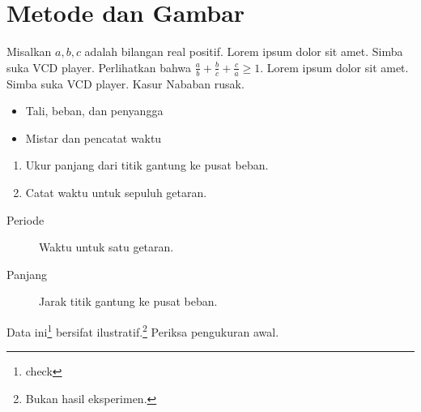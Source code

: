
\section{Metode dan Gambar}
    Misalkan $a,b,c$ adalah bilangan real positif. 
    Lorem ipsum dolor sit amet. Simba suka VCD player. 
    Perlihatkan bahwa $\frac{a}{b}+ \frac{b}{c}+ \frac{c}{a}\geq 1$. 
    Lorem ipsum dolor sit amet. Simba suka VCD player. Kasur Nababan rusak. 
    \begin{itemize}
        \item Tali, beban, dan penyangga
        \item Mistar dan pencatat waktu
    \end{itemize}
    \begin{enumerate}
        \item Ukur panjang dari titik gantung ke pusat beban.
        \item Catat waktu untuk sepuluh getaran.
    \end{enumerate}
    \begin{description}
        \item[Periode] Waktu untuk satu getaran.
        \item[Panjang] Jarak titik gantung ke pusat beban.
    \end{description}
    Data ini\footnote{check} bersifat ilustratif.\footnote{Bukan hasil eksperimen.}
    Periksa pengukuran awal.